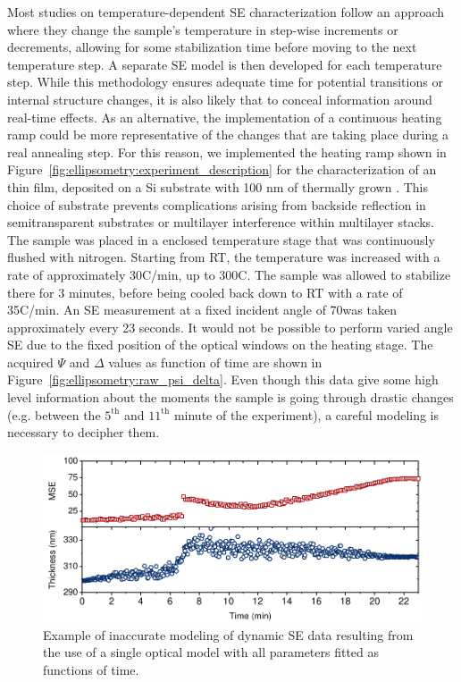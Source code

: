 Most studies on temperature-dependent SE characterization follow an approach where they change the sample's temperature in step-wise increments or decrements, allowing for some stabilization time before moving to the next temperature step. A separate SE model is then developed for each temperature step. While this methodology ensures adequate time for potential transitions or internal structure changes, it is also likely that to conceal information around real-time effects. As an alternative, the implementation of a continuous heating ramp could be more representative of the changes that are taking place during a real annealing step. For this reason, we implemented the heating ramp shown in Figure~\ref{fig:ellipsometry:experiment_description} for the characterization of an   thin film, deposited on a Si substrate with 100 nm of thermally grown . This choice of substrate prevents complications arising from backside reflection in semitransparent substrates or multilayer interference within multilayer stacks. The sample was placed in a enclosed temperature stage that was continuously flushed with nitrogen. Starting from RT, the temperature was increased with a rate of approximately 30\degree C/min, up to 300\degree C. The sample was allowed to stabilize there for 3 minutes, before being cooled back down to RT with a rate of 35\degree C/min. An SE measurement at a fixed incident angle of 70\degree was taken approximately every 23 seconds. It would not be possible to perform varied angle SE due to the fixed position of the optical windows on the heating stage. The acquired $\Psi$ and $\Delta$ values
as function of time are shown in Figure~\ref{fig:ellipsometry:raw_psi_delta}. Even though this data give some high level information about the moments the sample is going through drastic changes (e.g. between the $5^{\text{th}}$ and $11^{\text{th}}$ minute of the experiment), a careful modeling is necessary to decipher them. 

\begin{figure}
  \centering
  \medskip
  \includegraphics[width=.77\textwidth]{chapters/ellipsometry/image/wrong_model.pdf}
  \caption{Example of inaccurate modeling of dynamic SE data resulting from the use of a single optical model with all parameters fitted as functions of time.}
  \label{fig:ellipsometry:wrong_model}
\end{figure}

